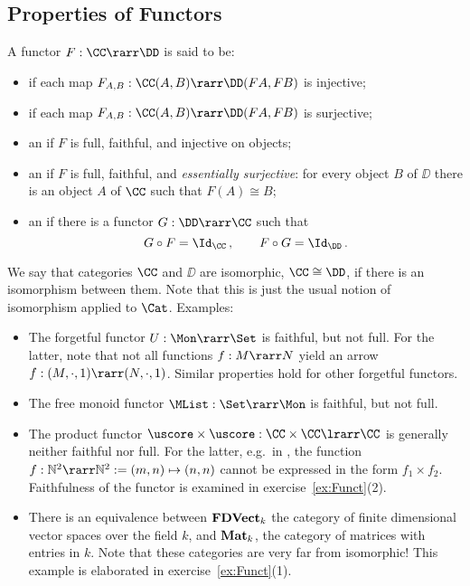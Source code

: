 \documentclass[12pt]{article}
\begin{document}
\subsection{Properties of Functors}
\begin{mydefinition}\label{d:equiv1}
A functor $F:\CC\rarr\DD$ is said to be:
\begin{itemize}
\item {} if each map $F_{A,B}: \CC(A,B)\rarr\DD(FA,FB)$ is injective;
\item {} if each map $F_{A,B} :\CC (A, B) \rarr\DD (FA, FB)$ is surjective;
\item an  if $F$ is full, faithful, and injective on objects;
\item an  if $F$ is  full, faithful, and \emph{essentially surjective}: \ie for every object $B$ of $\DD$ there is
    an object $A$ of $\CC$ such that $F(A) \cong B$;
\item an  if there is a functor $G:\DD\rarr\CC$ such that
\[ G \circ F = \Id_{\CC}\,, \qquad F \circ G = \Id_{\DD}\,. \]
\deq[-1]
\end{itemize}
\end{mydefinition}
%
We say that categories $\CC$ and $\DD$ are isomorphic, $\CC\cong\DD$, if there is an isomorphism between them.
Note that this is just the usual notion of isomorphism applied to $\Cat$.
%
Examples:
\begin{itemize}
\item The forgetful functor $U : \Mon\rarr\Set$  is faithful, but not full. For the latter, note that not all functions $f:M\rarr N$ yield an arrow
    $f:(M,\cdot,1)\rarr(N,\cdot,1)$. Similar properties hold for other forgetful functors.
\item The free monoid functor $\MList:\Set\rarr\Mon$ is faithful, but not full.
\item The product functor $\uscore\times\uscore:\CC\times\CC\lrarr\CC$ is generally neither faithful nor full.
    For the latter, e.g.~in \Set, the function $f:\mathbb{N}^2\rarr\mathbb{N}^2:=(m,n)\mapsto(n,n)$ cannot be expressed in the form $f_1\times f_2$. Faithfulness of the functor is examined in exercise~\ref{ex:Funct}(2).
\item There is an equivalence between $\text{\textbf{FDVect}}_{k}$ the category of finite dimensional vector spaces over the field $k$, and
$\text{\textbf{Mat}}_{k}$, the category of matrices with entries in  $k$. Note that these categories are  very far from isomorphic! This example is elaborated in  exercise~\ref{ex:Funct}(1).
\end{itemize}
\end{document}

